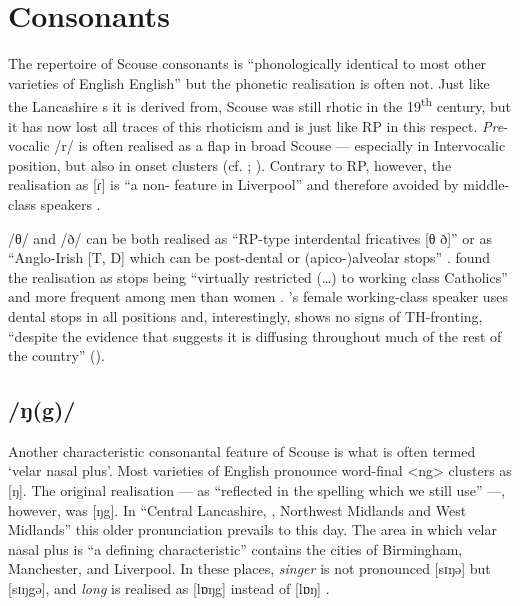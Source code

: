 	\section{Consonants}\label{sec.var.con}

The repertoire of Scouse consonants is ``phonologically identical to most other varieties of English English'' \citep[351]{watson2007} but the phonetic realisation is often not.
Just like the Lancashire s it is derived from, Scouse was still rhotic in the 19\textsuperscript{th} century, but it has now lost all traces of this rhoticism \citep[cf.][149]{knowles1997} and is just like RP in this respect.
\emph{Pre}-vocalic /r/ is often realised as a flap in broad Scouse --- especially in Intervocalic  position, but also in onset clusters (cf. \citealt[107 and 329--330]{knowles1973}; \citealt[352]{watson2007}).
Contrary to RP, however, the realisation as [ɾ] is ``a non- feature in Liverpool'' and therefore avoided by middle-class speakers \citep[329]{knowles1973}.

/θ/ and /ð/ can be both realised as ``RP-type interdental fricatives [θ ð]'' or as ``Anglo-Irish [T, D] which can be post-dental or (apico-)alveolar stops'' \citep[323]{knowles1973}.
\citeauthor{knowles1973} found the realisation as stops being ``virtually restricted (\ldots) to working class Catholics'' and more frequent among men than women \citep[323--324]{knowles1973}.
\cite{watson2007}'s female working-class speaker uses dental stops in all positions and, interestingly, shows no signs of TH-fronting, ``despite the evidence that suggests it is diffusing throughout much of the rest of the country'' (\cite[cf.][352]{watson2007}).

		\subsection{/ŋ(g)/}\label{sec.var.con.ng}

Another characteristic consonantal feature of Scouse is what is often termed `velar nasal plus'.
Most varieties of English pronounce word-final  <ng> clusters as [ŋ].
The original realisation --- as ``reflected in the spelling which we still use'' \citep[58]{trudgill1999} ---, however, was [ŋg]. In ``Central Lancashire, , Northwest Midlands and West Midlands'' \citep[58]{trudgill1999} this older pronunciation prevails to this day. 
The area in which velar nasal plus is ``a defining characteristic'' \citep[58]{trudgill1999} contains the cities of Birmingham, Manchester, and Liverpool.
In these places, \emph{singer} is not pronounced [sɪŋə] but [sɪŋgə], and \emph{long} is realised as [lɒŋg] instead of [lɒŋ] \citep[cf.][58]{trudgill1999}.

